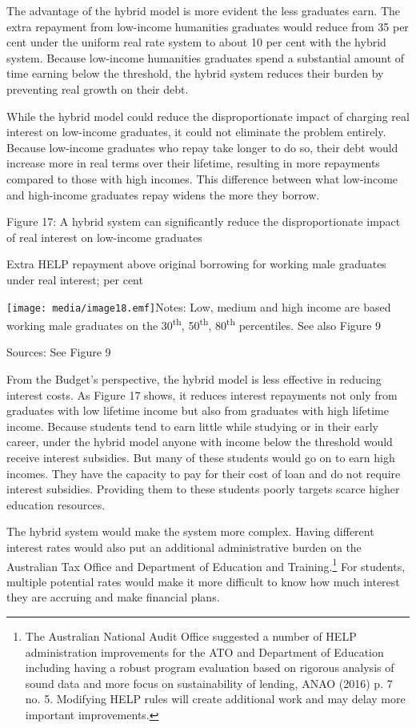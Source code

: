 \documentclass[]{book}
\begin{document}
The advantage of the hybrid model is more evident the less graduates earn. The extra repayment from low-income humanities graduates would reduce from 35 per cent under the uniform real rate system to about 10 per cent with the hybrid system. Because low-income humanities graduates spend a substantial amount of time earning below the threshold, the hybrid system reduces their burden by preventing real growth on their debt.

While the hybrid model could reduce the disproportionate impact of charging real interest on low-income graduates, it could not eliminate the problem entirely. Because low-income graduates who repay take longer to do so, their debt would increase more in real terms over their lifetime, resulting in more repayments compared to those with high incomes. This difference between what low-income and high-income graduates repay widens the more they borrow.

\protect\hypertarget{_Ref310674502}{}{}Figure 17: A hybrid system can significantly reduce the disproportionate impact of real interest on low-income graduates

Extra HELP repayment above original borrowing for working male graduates under real interest; per cent

\texttt{[image: media/image18.emf]}Notes: Low, medium and high income are based working male graduates on the 30\textsuperscript{th}, 50\textsuperscript{th}, 80\textsuperscript{th} percentiles. See also Figure 9

Sources: See Figure 9

From the Budget's perspective, the hybrid model is less effective in reducing interest costs. As Figure 17 shows, it reduces interest repayments not only from graduates with low lifetime income but also from graduates with high lifetime income. Because students tend to earn little while studying or in their early career, under the hybrid model anyone with income below the threshold would receive interest subsidies. But many of these students would go on to earn high incomes. They have the capacity to pay for their cost of loan and do not require interest subsidies. Providing them to these students poorly targets scarce higher education resources.

The hybrid system would make the system more complex. Having different interest rates would also put an additional administrative burden on the Australian Tax Office and Department of Education and Training.\footnote{The Australian National Audit Office suggested a number of HELP administration improvements for the ATO and Department of Education including having a robust program evaluation based on rigorous analysis of sound data and more focus on sustainability of lending, ANAO (2016) p. 7 no. 5. Modifying HELP rules will create additional work and may delay more important improvements.} For students, multiple potential rates would make it more difficult to know how much interest they are accruing and make financial plans.
\end{document}
